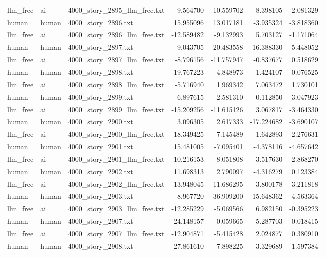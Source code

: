 \begin{longtable}{lllrrrr}
llm\_free & ai & 4000\_story\_2895\_llm\_free.txt & -9.564700 & -10.559702 & 8.398105 & 2.081329 \\
human & human & 4000\_story\_2896.txt & 15.955096 & 13.017181 & -3.935324 & -3.818360 \\
llm\_free & ai & 4000\_story\_2896\_llm\_free.txt & -12.589482 & -9.132993 & 5.703127 & -1.171064 \\
human & human & 4000\_story\_2897.txt & 9.043705 & 20.483558 & -16.388330 & -5.448052 \\
llm\_free & ai & 4000\_story\_2897\_llm\_free.txt & -8.796156 & -11.757947 & -0.837677 & 0.518629 \\
human & human & 4000\_story\_2898.txt & 19.767223 & -4.848973 & 1.424107 & -0.076525 \\
llm\_free & ai & 4000\_story\_2898\_llm\_free.txt & -5.716940 & 1.969342 & 7.063472 & 1.730101 \\
human & human & 4000\_story\_2899.txt & 6.897615 & -2.581310 & -0.112850 & -3.047923 \\
llm\_free & ai & 4000\_story\_2899\_llm\_free.txt & -15.209256 & -11.615126 & 3.067817 & -3.464330 \\
human & human & 4000\_story\_2900.txt & 3.096305 & 2.617333 & -17.224682 & -3.690107 \\
llm\_free & ai & 4000\_story\_2900\_llm\_free.txt & -18.349425 & -7.145489 & 1.642893 & -2.276631 \\
human & human & 4000\_story\_2901.txt & 15.481005 & -7.095401 & -4.378116 & -4.657642 \\
llm\_free & ai & 4000\_story\_2901\_llm\_free.txt & -10.216153 & -8.051808 & 3.517630 & 2.868270 \\
human & human & 4000\_story\_2902.txt & 11.698313 & 2.790097 & -4.316279 & 0.123384 \\
llm\_free & ai & 4000\_story\_2902\_llm\_free.txt & -13.948045 & -11.686295 & -3.800178 & -3.211818 \\
human & human & 4000\_story\_2903.txt & 8.967720 & 36.909200 & -15.648362 & -4.563364 \\
llm\_free & ai & 4000\_story\_2903\_llm\_free.txt & -12.285229 & -5.069566 & 6.982150 & -0.395223 \\
human & human & 4000\_story\_2907.txt & 24.148157 & -0.059665 & 5.287703 & 0.018415 \\
llm\_free & ai & 4000\_story\_2907\_llm\_free.txt & -12.904871 & -5.415428 & 2.024877 & 0.380910 \\
human & human & 4000\_story\_2908.txt & 27.861610 & 7.898225 & 3.329689 & 1.597384 \\

\end{longtable}
